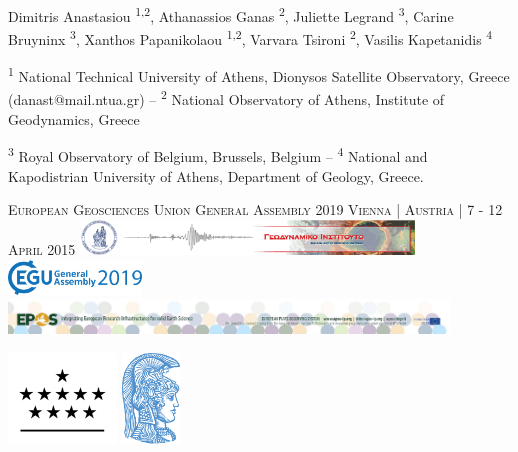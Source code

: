 \documentclass[landscape,a0paper,fontscale=0.346]{baposter} %
\begin{document}
\begin{poster}
{\large Dimitris Anastasiou \textsuperscript{1,2}, Athanassios Ganas \textsuperscript{2}, Juliette Legrand \textsuperscript{3}, Carine Bruyninx \textsuperscript{3}, Xanthos Papanikolaou \textsuperscript{1,2}, Varvara Tsironi \textsuperscript{2}, Vasilis Kapetanidis \textsuperscript{4} 
{\small \par{\textsuperscript{1} National Technical University of Athens, Dionysos Satellite Observatory, Greece (danast@mail.ntua.gr) -- \textsuperscript{2} National Observatory of Athens, Institute of Geodynamics, Greece} 
\par{\textsuperscript{3} Royal Observatory of Belgium, Brussels, Belgium --  \textsuperscript{4} National and Kapodistrian University of Athens, Department of Geology, Greece. }} \vspace{0.3em}
\par{\textsc{European Geosciences Union General Assembly 2019 Vienna | Austria | 7 - 12 April 2015}} 
\vskip 0.2cm
{\includegraphics[height=2.5em]{../../logos/gein_logo.png} \includegraphics[height=2.5em]{../../logos/egu19_logo.png} \includegraphics[height=2.5em]{../../logos/epos_logo_big.jpg}} %

 }
{\includegraphics[height=6.5em]{../../logos/logo_orb.png} \includegraphics[height=6.5em]{../../logos/logo_uoa_blue.png}} %


\end{poster}
\end{document}
